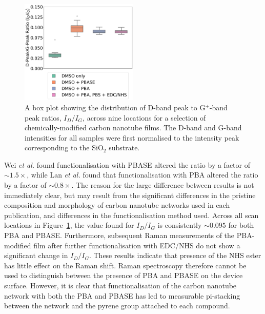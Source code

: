 \documentclass[
  a4paper,
]{scrbook}
\begin{document}
\begin{figure}

{\centering \includegraphics[width=0.5\textwidth,height=\textheight]{figures/ch6/comparison_raman.png}

}

\caption[A box plot showing the distribution of D-band peak to
G\(^+\)-band peak ratios, \(I_D/I_G\), across nine locations for a
selection of chemically-modified carbon nanotube
films.]{\label{fig-linker-raman}A box plot showing the distribution of
D-band peak to G\(^+\)-band peak ratios, \(I_D/I_G\), across nine
locations for a selection of chemically-modified carbon nanotube films.
The D-band and G-band intensities for all samples were first normalised
to the intensity peak corresponding to the SiO\(_2\) substrate.}

\end{figure}

Wei \emph{et al.} \autocite{Wei2010} found functionalisation with PBASE
altered the ratio by a factor of \(\sim 1.5 \times\), while Lan \emph{et
al.} \autocite{Lan2013} found that functionalisation with PBA altered
the ratio by a factor of \(\sim 0.8 \times\). The reason for the large
difference between results is not immediately clear, but may result from
the significant differences in the pristine composition and morphology
of carbon nanotube networks used in each publication, and differences in
the functionalisation method used. Across all scan locations in
Figure~\ref{fig-linker-raman}, the value found for \(I_D/I_G\) is
consistently \(\sim 0.095\) for both PBA and PBASE. Furthermore,
subsequent Raman measurements of the PBA-modified film after further
functionalisation with EDC/NHS do not show a significant change in
\(I_D/I_G\). These results indicate that presence of the NHS ester has
little effect on the Raman shift. Raman spectroscopy therefore cannot be
used to distinguish between the presence of PBA and PBASE on the device
surface. However, it is clear that functionalisation of the carbon
nanotube network with both the PBA and PBASE has led to measurable
pi-stacking between the network and the pyrene group attached to each
compound.
\end{document}
